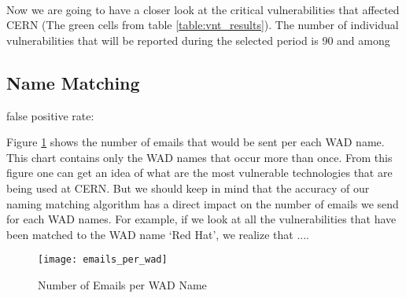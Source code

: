 {{\paragraph{}
Now we are going to have a closer look at the critical vulnerabilities that affected CERN (The green cells from table \ref{table:vnt_results}). The number of individual vulnerabilities that will be reported during the selected period is 90 and among

\subsection{Name Matching }
false positive rate:

Figure \ref{figure:emails_per_wad} shows the number of emails that would be sent per each WAD name. This chart contains only the WAD names that occur more than once. From this figure one can get an idea of what are the most vulnerable technologies that are being used at CERN. But we should keep in mind that the accuracy of our naming matching algorithm has a direct impact on the number of emails we send for each WAD names. For example, if we look at all the vulnerabilities that have been matched to the WAD name `Red Hat', we realize that ....





\begin{figure}[h!]
\label{figure:emails_per_wad}
  \centering
    \texttt{[image: emails\_per\_wad]}
  \caption{Number of Emails per WAD Name}
\end{figure}













\begin{table}
\begin{center}
    \begin{tabular}{ | c || c | c || c | c |}
    
    \hline
	 

\end{tabular}
\end{center}
\end{table}}}
